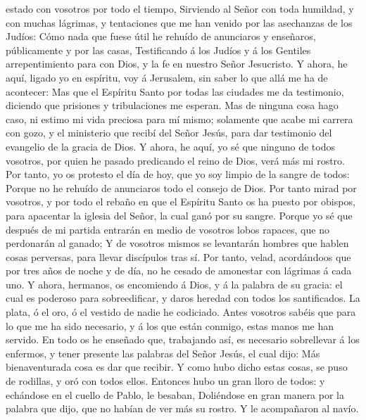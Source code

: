 estado con vosotros por todo el tiempo,  Sirviendo al Señor
con toda humildad, y con muchas lágrimas, y tentaciones que me han
venido por las asechanzas de los Judíos:  Cómo nada que
fuese útil he rehuído de anunciaros y enseñaros, públicamente y por las
casas,  Testificando á los Judíos y á los Gentiles
arrepentimiento para con Dios, y la fe en nuestro Señor Jesucristo.
 Y ahora, he aquí, ligado yo en espíritu, voy á Jerusalem,
sin saber lo que allá me ha de acontecer:  Mas que el
Espíritu Santo por todas las ciudades me da testimonio, diciendo que
prisiones y tribulaciones me esperan.  Mas de ninguna cosa
hago caso, ni estimo mi vida preciosa para mí mismo; solamente que acabe
mi carrera con gozo, y el ministerio que recibí del Señor Jesús, para
dar testimonio del evangelio de la gracia de Dios.  Y
ahora, he aquí, yo sé que ninguno de todos vosotros, por quien he pasado
predicando el reino de Dios, verá más mi rostro.  Por
tanto, yo os protesto el día de hoy, que yo soy limpio de la sangre de
todos:  Porque no he rehuído de anunciaros todo el consejo
de Dios.  Por tanto mirad por vosotros, y por todo el
rebaño en que el Espíritu Santo os ha puesto por obispos, para apacentar
la iglesia del Señor, la cual ganó por su sangre.  Porque
yo sé que después de mi partida entrarán en medio de vosotros lobos
rapaces, que no perdonarán al ganado;  Y de vosotros mismos
se levantarán hombres que hablen cosas perversas, para llevar discípulos
tras sí.  Por tanto, velad, acordándoos que por tres años
de noche y de día, no he cesado de amonestar con lágrimas á cada uno.
 Y ahora, hermanos, os encomiendo á Dios, y á la palabra de
su gracia: el cual es poderoso para sobreedificar, y daros heredad con
todos los santificados.  La plata, ó el oro, ó el vestido
de nadie he codiciado.  Antes vosotros sabéis que para lo
que me ha sido necesario, y á los que están conmigo, estas manos me han
servido.  En todo os he enseñado que, trabajando así, es
necesario sobrellevar á los enfermos, y tener presente las palabras del
Señor Jesús, el cual dijo: Más bienaventurada cosa es dar que recibir.
 Y como hubo dicho estas cosas, se puso de rodillas, y oró
con todos ellos.  Entonces hubo un gran lloro de todos: y
echándose en el cuello de Pablo, le besaban,  Doliéndose en
gran manera por la palabra que dijo, que no habían de ver más su rostro.
Y le acompañaron al navío.

